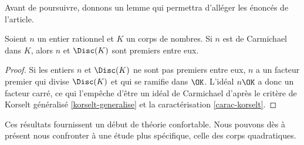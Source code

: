 Avant de poursuivre, donnons un lemme qui permettra d'alléger les énoncés de l'article.

\begin{lemme}
	Soient $n$ un entier rationnel et $K$ un corps de nombres. Si $n$ est de Carmichael dans $K$, alors $n$ et $\Disc(K)$ sont premiers entre eux.
\end{lemme}

\begin{proof}
	Si les entiers $n$ et $\Disc(K)$ ne sont pas premiers entre eux, $n$ a un facteur premier qui divise $\Disc(K)$ et qui se ramifie dans $\OK$. L'idéal $n\OK$ a donc un facteur carré, ce qui l'empêche d'être un idéal de Carmichael d'après le critère de Korselt généralisé \ref{korselt-generalise} et la caractérisation \ref{carac-korselt}.
\end{proof}

Ces résultats fournissent un début de théorie confortable. Nous pouvons dès à présent nous confronter à une étude plus spécifique, celle des corps quadratiques.
